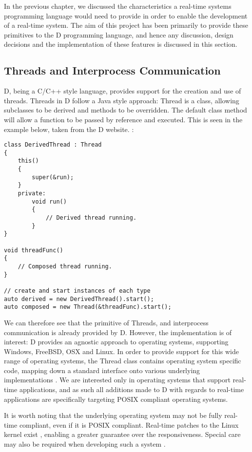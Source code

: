 
In the previous chapter, we discussed the characteristics a real-time 
systems programming language would need to provide in order to enable the 
development of a real-time system. The aim of this project has been primarily to 
provide these primitives to the D programming language, and hence any discussion, 
design decisions and the implementation of these features is discussed in this 
section. 

\subsection{Threads and Interprocess Communication}
D, being a C/C++ style language, provides support for the creation and use of 
threads. Threads in D follow a Java style approach: Thread is a class, 
allowing subclasses to be derived and methods to be overridden. The default 
class method will allow a function to be passed by reference and executed. 
This is seen in the example below, taken from the D website. 
\cite{http://dlang.org/phobos/core_thread.html}: 
\begin{lstlisting}
class DerivedThread : Thread
{
    this()
    {
        super(&run);
    }
    private:
        void run()
        {
            // Derived thread running.
        }
}

void threadFunc()
{
    // Composed thread running.
}

// create and start instances of each type
auto derived = new DerivedThread().start();
auto composed = new Thread(&threadFunc).start();
\end{lstlisting}
We can therefore see that the primitive of Threads, and interprocess communication 
is already provided by D. However, the implementation is of interest: D 
provides an agnostic approach to operating systems, supporting Windows, FreeBSD, 
OSX and Linux. 
In order to provide support for this wide range of operating systems, the Thread 
class contains operating system specific code, mapping down a standard interface 
onto various underlying implementations 
\cite{https://github.com/D-Programming-Language/druntime/blob/master/src/core/thread.d}. 
We are interested only in operating systems 
that support real-time applications, and as such all additions made to D with 
regards to real-time applications are specifically targeting POSIX compliant 
operating systems. 
\par\bigskip\noindent
It is worth noting that the underlying operating system may not be fully
real-time compliant, even if it is POSIX compliant. Real-time patches to the 
Linux kernel exist 
\cite{https://rt.wiki.kernel.org/index.php/Main_Page}, enabling a greater 
guarantee over the responsiveness. Special care may also be required when 
developing such a system 
\cite {https://rt.wiki.kernel.org/index.php/HOWTO:_Build_an_RT-application}. 

